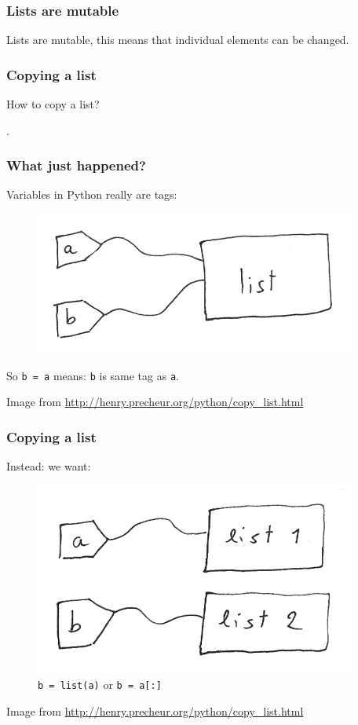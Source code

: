 \begin{frame}\frametitle{Lists are mutable}

    Lists are mutable, this means that individual elements can be changed.


\end{frame}

\begin{frame}\frametitle{Copying a list}
    How to copy a list?

    .

\end{frame}

\begin{frame}\frametitle{What just happened?}
    Variables in Python really are tags:

    \begin{figure}
        \centering
        \includegraphics{img/list_tag.png}
    \end{figure}

    So \texttt{b = a} means: \texttt{b} is same tag as \texttt{a}.

    \vfill
    \tiny{Image from \url{http://henry.precheur.org/python/copy_list.html}}

\end{frame}

\begin{frame}\frametitle{Copying a list}

    Instead: we want:
    \begin{figure}
        \centering
        \includegraphics{img/list_tag2.png}
        \caption{\texttt{b = list(a)} or \texttt{b = a[:]}}
    \end{figure}

    \vfill
    \tiny{Image from \url{http://henry.precheur.org/python/copy_list.html}}

\end{frame}

